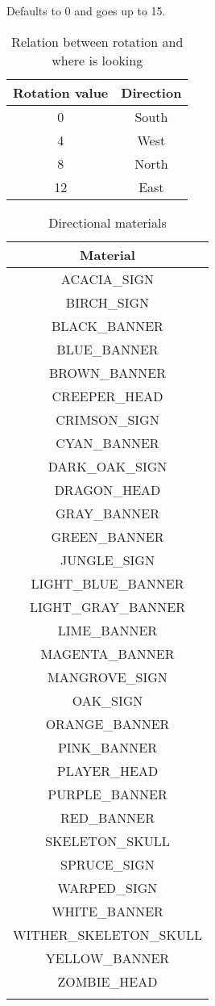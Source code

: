 Defaults to 0 and goes up to 15.

\begin{table}[H]
	\centering
	\begin{tabular}{ |c|c| }
		\hline
		Rotation value & Direction \\
		\hline
		0 & South \\
		4 & West \\
		8 & North \\
		12 & East \\
		\hline
	\end{tabular}
	\caption{Relation between rotation and where is looking}
\end{table}

\begin{longtable}{ |c| }
	\hline
	Material \\
	\hline
	\endhead
	ACACIA\_SIGN \\
	BIRCH\_SIGN \\
	BLACK\_BANNER \\
	BLUE\_BANNER \\
	BROWN\_BANNER \\
	CREEPER\_HEAD \\
	CRIMSON\_SIGN \\
	CYAN\_BANNER \\
	DARK\_OAK\_SIGN \\
	DRAGON\_HEAD \\
	GRAY\_BANNER \\
	GREEN\_BANNER \\
	JUNGLE\_SIGN \\
	LIGHT\_BLUE\_BANNER \\
	LIGHT\_GRAY\_BANNER \\
	LIME\_BANNER \\
	MAGENTA\_BANNER \\
	MANGROVE\_SIGN \\
	OAK\_SIGN \\
	ORANGE\_BANNER \\
	PINK\_BANNER \\
	PLAYER\_HEAD \\
	PURPLE\_BANNER \\
	RED\_BANNER \\
	SKELETON\_SKULL \\
	SPRUCE\_SIGN \\
	WARPED\_SIGN \\
	WHITE\_BANNER \\
	WITHER\_SKELETON\_SKULL \\
	YELLOW\_BANNER \\
	ZOMBIE\_HEAD \\
	\hline
	\caption{Directional materials}
\end{longtable}


